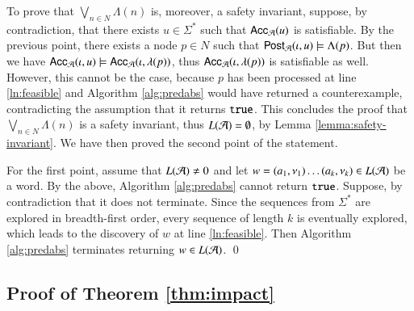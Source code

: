 \documentclass[10pt]{llncs}
\begin{document}
{  To prove that $\bigvee_{n \in N} \Lambda(n)$ is, moreover, a safety
  invariant, suppose, by contradiction, that there exists $u \in
  \Sigma^*$ such that $\mathsf{Acc}_{\mathcal{A}}(u)$ is satisfiable. By the previous
  point, there exists a node $p \in N$ such that $\mathsf{Post}_{\mathcal{A}}(\iota,u)
  \models \Lambda(p)$. But then we have $\mathsf{Acc}_{\mathcal{A}}(\iota,u) \models
  \mathsf{Acc}_{\mathcal{A}}(\iota,\lambda(p))$, thus $\mathsf{Acc}_{\mathcal{A}}(\iota,\lambda(p))$
  is satisfiable as well. However, this cannot be the case, because
  $p$ has been processed at line \ref{ln:feasible} and Algorithm
  \ref{alg:predabs} would have returned a counterexample,
  contradicting the assumption that it returns $\mathtt{true}$. This concludes
  the proof that $\bigvee_{n\in N} \Lambda(n)$ is a safety invariant,
  thus $L(\mathcal{A}) = \emptyset$, by Lemma \ref{lemma:safety-invariant}. We
  have then proved the second point of the statement.

  For the first point, assume that $L(\mathcal{A}) \neq 0$ and let $w =
  (a_1,\nu_1) \ldots (a_k,\nu_k) \in L(\mathcal{A})$ be a word. By the above,
  Algorithm \ref{alg:predabs} cannot return $\mathtt{true}$. Suppose, by
  contradiction that it does not terminate. Since the sequences from
  $\Sigma^*$ are explored in breadth-first order, every sequence of
  length $k$ is eventually explored, which leads to the discovery of
  $w$ at line \ref{ln:feasible}. Then Algorithm \ref{alg:predabs}
  terminates returning $w \in L(\mathcal{A})$. \qed}

\subsection*{Proof of Theorem \ref{thm:impact}}
\end{document}
